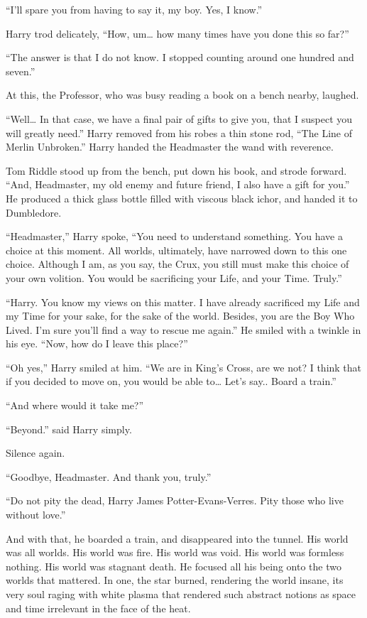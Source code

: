 “I’ll spare you from having to say it, my boy. Yes, I know.”

Harry trod delicately, “How, um… how many times have you done this so far?”

“The answer is that I do not know. I stopped counting around one hundred and seven.”

At this, the Professor, who was busy reading a book on a bench nearby, laughed.

“Well… In that case, we have a final pair of gifts to give you, that I suspect you will greatly need.” Harry removed from his robes a thin stone rod, “The Line of Merlin Unbroken.” Harry handed the Headmaster the wand with reverence.

Tom Riddle stood up from the bench, put down his book, and strode forward. “And, Headmaster, my old enemy and future friend, I also have a gift for you.” He produced a thick glass bottle filled with viscous black ichor, and handed it to Dumbledore.

“Headmaster,” Harry spoke, “You need to understand something. You have a choice at this moment. All worlds, ultimately, have narrowed down to this one choice. Although I am, as you say, the Crux, you still must make this choice of your own volition. You would be sacrificing your Life, and your Time. Truly.”

“Harry. You know my views on this matter. I have already sacrificed my Life and my Time for your sake, for the sake of the world. Besides, you are the Boy Who Lived. I’m sure you’ll find a way to rescue me again.” He smiled with a twinkle in his eye. “Now, how do I leave this place?”

“Oh yes,” Harry smiled at him. “We are in King’s Cross, are we not? I think that if you decided to move on, you would be able to… Let’s say.. Board a train.”

“And where would it take me?”

“Beyond.” said Harry simply.

Silence again.

“Goodbye, Headmaster. And thank you, truly.”

“Do not pity the dead, Harry James Potter-Evans-Verres. Pity those who live without love.”

And with that, he boarded a train, and disappeared into the tunnel. His world was all worlds. His world was fire. His world was void. His world was formless nothing. His world was stagnant death. He focused all his being onto the two worlds that mattered. In one, the star burned, rendering the world insane, its very soul raging with white plasma that rendered such abstract notions as space and time irrelevant in the face of the heat.

